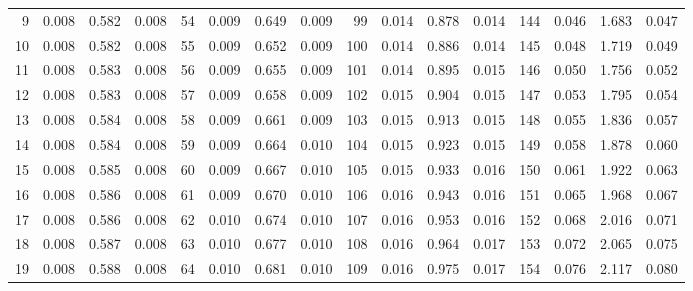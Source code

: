 \begin{table}[!h]
{\begin{tabular}{rrrr|rrrr|rrrr|crrr}
  9 & \tiny{  0.008} &   0.582 & \tiny{  0.008} &  54 & \tiny{  0.009} &   0.649 & \tiny{  0.009} &  99 & \tiny{  0.014} &   0.878 & \tiny{  0.014} & 144 & \tiny{  0.046} &   1.683 & \tiny{  0.047}\\
 10 & \tiny{  0.008} &   0.582 & \tiny{  0.008} &  55 & \tiny{  0.009} &   0.652 & \tiny{  0.009} & 100 & \tiny{  0.014} &   0.886 & \tiny{  0.014} & 145 & \tiny{  0.048} &   1.719 & \tiny{  0.049}\\
 11 & \tiny{  0.008} &   0.583 & \tiny{  0.008} &  56 & \tiny{  0.009} &   0.655 & \tiny{  0.009} & 101 & \tiny{  0.014} &   0.895 & \tiny{  0.015} & 146 & \tiny{  0.050} &   1.756 & \tiny{  0.052}\\
 12 & \tiny{  0.008} &   0.583 & \tiny{  0.008} &  57 & \tiny{  0.009} &   0.658 & \tiny{  0.009} & 102 & \tiny{  0.015} &   0.904 & \tiny{  0.015} & 147 & \tiny{  0.053} &   1.795 & \tiny{  0.054}\\
 13 & \tiny{  0.008} &   0.584 & \tiny{  0.008} &  58 & \tiny{  0.009} &   0.661 & \tiny{  0.009} & 103 & \tiny{  0.015} &   0.913 & \tiny{  0.015} & 148 & \tiny{  0.055} &   1.836 & \tiny{  0.057}\\
 14 & \tiny{  0.008} &   0.584 & \tiny{  0.008} &  59 & \tiny{  0.009} &   0.664 & \tiny{  0.010} & 104 & \tiny{  0.015} &   0.923 & \tiny{  0.015} & 149 & \tiny{  0.058} &   1.878 & \tiny{  0.060}\\
 15 & \tiny{  0.008} &   0.585 & \tiny{  0.008} &  60 & \tiny{  0.009} &   0.667 & \tiny{  0.010} & 105 & \tiny{  0.015} &   0.933 & \tiny{  0.016} & 150 & \tiny{  0.061} &   1.922 & \tiny{  0.063}\\
 16 & \tiny{  0.008} &   0.586 & \tiny{  0.008} &  61 & \tiny{  0.009} &   0.670 & \tiny{  0.010} & 106 & \tiny{  0.016} &   0.943 & \tiny{  0.016} & 151 & \tiny{  0.065} &   1.968 & \tiny{  0.067}\\
 17 & \tiny{  0.008} &   0.586 & \tiny{  0.008} &  62 & \tiny{  0.010} &   0.674 & \tiny{  0.010} & 107 & \tiny{  0.016} &   0.953 & \tiny{  0.016} & 152 & \tiny{  0.068} &   2.016 & \tiny{  0.071}\\
 18 & \tiny{  0.008} &   0.587 & \tiny{  0.008} &  63 & \tiny{  0.010} &   0.677 & \tiny{  0.010} & 108 & \tiny{  0.016} &   0.964 & \tiny{  0.017} & 153 & \tiny{  0.072} &   2.065 & \tiny{  0.075}\\
 19 & \tiny{  0.008} &   0.588 & \tiny{  0.008} &  64 & \tiny{  0.010} &   0.681 & \tiny{  0.010} & 109 & \tiny{  0.016} &   0.975 & \tiny{  0.017} & 154 & \tiny{  0.076} &   2.117 & \tiny{  0.080}\\

\end{tabular}}
\end{table}
